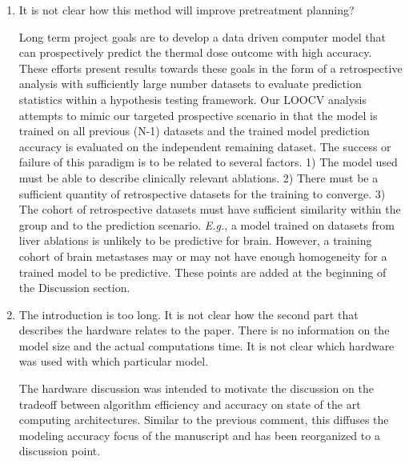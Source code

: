\documentclass[letterpaper,12pt]{report}
\begin{document}
\begin{enumerate}
{}
\item
It is not clear how this method will improve pretreatment planning?

{\color{red}
Long term project goals are to develop a data driven computer model
that can prospectively predict the thermal dose outcome with high
accuracy. These efforts present results towards these goals
in the form of a retrospective analysis
with sufficiently large number datasets to evaluate prediction
statistics within a hypothesis testing framework. 
Our LOOCV analysis attempts to mimic our targeted prospective scenario
in that the model is trained on all previous (N-1) datasets and
the trained model prediction accuracy is evaluated on the
independent remaining dataset.
The success or failure of this paradigm is
to be related to several factors. 1) The model used must be able to
describe clinically relevant ablations. 2) There must be a sufficient
quantity of retrospective datasets for the
training to converge. 3) The cohort of retrospective datasets must have sufficient similarity within the
group and to the prediction scenario. \textit{E.g.}, a model trained on datasets from liver ablations is unlikely to
be predictive for brain. However, a training cohort of brain
metastases may or may not have enough homogeneity for a trained model
to be predictive. These points are added at the beginning of
the Discussion section.
}
\item
The introduction is too long. It is not clear how the second part that
describes the hardware relates to the paper.  There is no information
on the model size and the actual computations time.
It is not clear which hardware was used with which particular model. 

{\color{red}
The hardware discussion was intended to
motivate the discussion on the tradeoff between algorithm efficiency and
accuracy on state of the art computing architectures. 
Similar to the previous comment, this diffuses the modeling accuracy focus of the 
manuscript and has been reorganized to a discussion point.

}
\end{enumerate}
\end{document}
